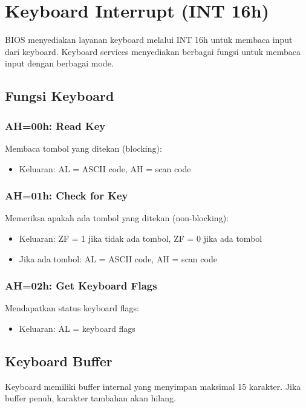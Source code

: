 \documentclass[../main.tex]{subfiles}
\begin{document}
    \section{Keyboard Interrupt (INT 16h)}
        BIOS menyediakan layanan keyboard melalui INT 16h untuk membaca input dari keyboard. Keyboard services menyediakan berbagai fungsi untuk membaca input dengan berbagai mode.

        \subsection{Fungsi Keyboard}
            \subsubsection{AH=00h: Read Key}
                Membaca tombol yang ditekan (blocking):
                \begin{itemize}
                    \item Keluaran: AL = ASCII code, AH = scan code
                \end{itemize}

            \subsubsection{AH=01h: Check for Key}
                Memeriksa apakah ada tombol yang ditekan (non-blocking):
                \begin{itemize}
                    \item Keluaran: ZF = 1 jika tidak ada tombol, ZF = 0 jika ada tombol
                    \item Jika ada tombol: AL = ASCII code, AH = scan code
                \end{itemize}

            \subsubsection{AH=02h: Get Keyboard Flags}
                Mendapatkan status keyboard flags:
                \begin{itemize}
                    \item Keluaran: AL = keyboard flags
                \end{itemize}

        \subsection{Keyboard Buffer}
            Keyboard memiliki buffer internal yang menyimpan maksimal 15 karakter. Jika buffer penuh, karakter tambahan akan hilang.
\end{document}
